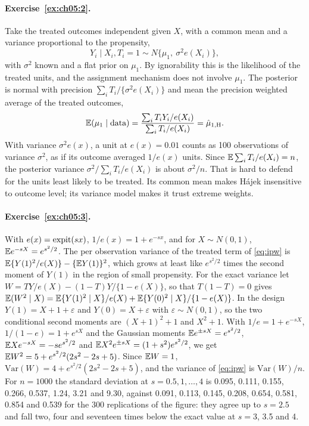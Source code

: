 \paragraph{Exercise~\ref{ex:ch05:2}.} Take the treated outcomes independent given $X$, with a common mean and a variance proportional to the propensity,
\[
Y_i \mid X_i, T_i = 1 \sim N\{\mu_1,\ \sigma^2 e(X_i)\},
\]
with $\sigma^2$ known and a flat prior on $\mu_1$. By ignorability this is the likelihood of the treated units, and the assignment mechanism does not involve $\mu_1$. The posterior is normal with precision $\sum_i T_i/\{\sigma^2 e(X_i)\}$ and mean the precision weighted average of the treated outcomes,
\[
\mathbb{E}(\mu_1 \mid \text{data}) = \frac{\sum_i T_iY_i/e(X_i)}{\sum_i T_i/e(X_i)} = \hat\mu_{1,\mathrm{H}}.
\]
With variance $\sigma^2e(x)$, a unit at $e(x)=0.01$ counts as 100 observations of variance $\sigma^2$, as if its outcome averaged $1/e(x)$ units. Since $\mathbb{E}\sum_iT_i/e(X_i)=n$, the posterior variance $\sigma^2/\sum_iT_i/e(X_i)$ is about $\sigma^2/n$. That is hard to defend for the units least likely to be treated. Its common mean makes H\'ajek insensitive to outcome level; its variance model makes it trust extreme weights.

\paragraph{Exercise~\ref{ex:ch05:3}.} With $e(x) = \operatorname{expit}(sx)$, $1/e(x) = 1 + e^{-sx}$, and for $X \sim N(0, 1)$, $\mathbb{E} e^{-sX} = e^{s^2/2}$. The per observation variance of the treated term of \eqref{eq:ipw} is $\mathbb{E}\{Y(1)^2/e(X)\} - \{\mathbb{E} Y(1)\}^2$, which grows at least like $e^{s^2/2}$ times the second moment of $Y(1)$ in the region of small propensity. For the exact variance let $W = TY/e(X) - (1 - T)Y/\{1 - e(X)\}$, so that $T(1 - T) = 0$ gives $\mathbb{E}(W^2 \mid X) = \mathbb{E}\{Y(1)^2 \mid X\}/e(X) + \mathbb{E}\{Y(0)^2 \mid X\}/\{1 - e(X)\}$. In the design $Y(1) = X + 1 + \varepsilon$ and $Y(0) = X + \varepsilon$ with $\varepsilon \sim N(0, 1)$, so the two conditional second moments are $(X + 1)^2 + 1$ and $X^2 + 1$. With $1/e = 1 + e^{-sX}$, $1/(1 - e) = 1 + e^{sX}$ and the Gaussian moments $\mathbb{E} e^{\pm sX} = e^{s^2/2}$, $\mathbb{E} Xe^{-sX} = -se^{s^2/2}$ and $\mathbb{E} X^2e^{\pm sX} = (1 + s^2)e^{s^2/2}$, we get $\mathbb{E} W^2 = 5 + e^{s^2/2}(2s^2 - 2s + 5)$. Since $\mathbb{E} W = 1$, $\mathrm{Var}(W) = 4 + e^{s^2/2}(2s^2 - 2s + 5)$, and the variance of \eqref{eq:ipw} is $\mathrm{Var}(W)/n$. For $n = 1000$ the standard deviation at $s = 0.5, 1, \ldots, 4$ is 0.095, 0.111, 0.155, 0.266, 0.537, 1.24, 3.21 and 9.30, against 0.091, 0.113, 0.145, 0.208, 0.654, 0.581, 0.854 and 0.539 for the 300 replications of the figure: they agree up to $s = 2.5$ and fall two, four and seventeen times below the exact value at $s = 3$, 3.5 and 4.

